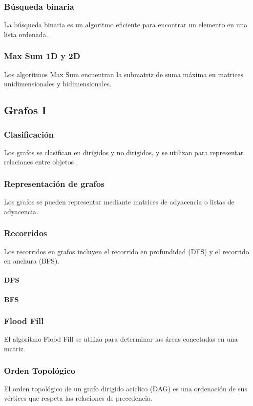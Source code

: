 \subsubsection{Búsqueda binaria}
La búsqueda binaria es un algoritmo eficiente para encontrar un elemento en una lista ordenada.
\subsubsection{Max Sum 1D y 2D}
Los algoritmos Max Sum encuentran la submatriz de suma máxima en matrices unidimensionales y bidimensionales.

\subsection{Grafos I}
\subsubsection{Clasificación}
Los grafos se clasifican en dirigidos y no dirigidos, y se utilizan para representar relaciones entre objetos \cite{skiena2008algorithm}.
\subsubsection{Representación de grafos}
Los grafos se pueden representar mediante matrices de adyacencia o listas de adyacencia.
\subsubsection{Recorridos}
Los recorridos en grafos incluyen el recorrido en profundidad (DFS) y el recorrido en anchura (BFS).
\paragraph{DFS}
\paragraph{BFS}
\subsubsection{Flood Fill}
El algoritmo Flood Fill se utiliza para determinar las áreas conectadas en una matriz.
\subsubsection{Orden Topológico}
El orden topológico de un grafo dirigido acíclico (DAG) es una ordenación de sus vértices que respeta las relaciones de precedencia.

